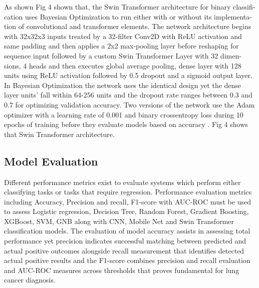 \documentclass[runningheads]{llncs}
\begin{document}
As shown Fig 4 shown that, the Swin Transformer architecture for binary classifi-cation uses Bayesian Optimization to run either with or without its implementa-tion of convolutional and transformer elements. The network architecture begins with 32x32x3 inputs treated by a 32-filter Conv2D with ReLU activation and same padding and then applies a 2x2 max-pooling layer before reshaping for sequence input followed by a custom Swin Transformer Layer with 32 dimen-sions, 4 heads and then executes global average pooling, dense layer with 128 units using ReLU activation followed by 0.5 dropout and a sigmoid output layer. In Bayesian Optimization the network uses the identical design yet the dense layer units’ fall within 64-256 units and the dropout rate ranges between 0.3 and 0.7 for optimizing validation accuracy. Two versions of the network use the Adam optimizer with a learning rate of 0.001 and binary crossentropy  loss during 10 epochs of training before they evaluate models based on accuracy \cite{sun2023}. Fig 4 shows that Swin Transformer architecture. 



\subsection{Model Evaluation }

Different performance metrics exist to evaluate systems which perform either classifying tasks or tasks that require regression. Performance evaluation metrics including Accuracy, Precision and recall, F1-score with AUC-ROC must be used to assess Logistic regression, Decision Tree, Random Forest, Gradient Boosting, XGBoost, SVM, GNB along with CNN, Mobile Net and Swin Transformer classification models. The evaluation of model accuracy assists in assessing total performance yet precision indicates successful matching between predicted and actual positive outcomes alongside recall measurement that identifies detected actual positive results and the F1-score combines precision and recall evaluation and AUC-ROC measures across thresholds that proves fundamental for lung cancer diagnosis.
\end{document}
